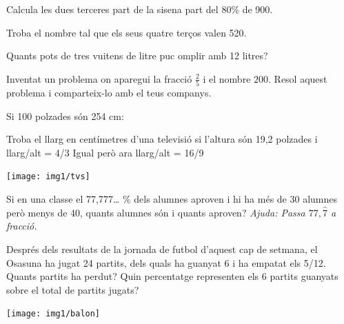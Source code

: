 \begin{mylist}
	\exer \spen  Calcula les dues terceres part de la sisena part del 80\% de 900.
 \vso

 
	\exer  \spen  Troba el nombre tal que els seus quatre terços valen 520.
 \vsoo
{}



 
	\exer  \spen  Quants pots de tres vuitens de litre puc omplir amb 12 litres?
 \vso
{}
 
	\exer  Inventat un problema on aparegui la fracció $\frac{2}{5}$ i el nombre $200$. Resol aquest problema i comparteix-lo amb el teus companys. 
	 
\redacta

\pagebreak
\mbox{}
\vspace{-1cm} 
 
 \exer \begin{minipage}[t]{0.56\textwidth}  Si 100 polzades són 254 cm:
 
\begin{tasks}
	\task Troba el llarg en centímetres d'una televisió si l'altura són 19,2 polzades i llarg/alt = 4/3
	\task Igual però ara llarg/alt = 16/9
\end{tasks}
\answers{[65.024 cm, 86.6986 cm]} 

\end{minipage}
\begin{minipage}{0.44\textwidth}
	\centering
	\vspace{0.5cm}
	\texttt{[image: img1/tvs]}
\end{minipage}

 
	\exer  Si en una classe el 77,777{\dots} \% dels alumnes aproven i hi ha més de 30 alumnes però menys de 40, quants alumnes són i quants aproven? \textit{Ajuda: Passa $77,\hat{7}$ a fracció.}
 


\vspace{-0.75cm}
	\exer  
	\begin{minipage}[t]{0.8\textwidth}
	Després dels resultats de la jornada de futbol d'aquest cap de setmana, el Osasuna ha jugat 24 partits, dels quals ha guanyat 6 i ha empatat els 5/12. Quants partits ha perdut? Quin percentatge representen els 6 partits guanyats sobre el total de partits jugats?
	\end{minipage}
	\begin{minipage}{0.2\textwidth}
		\centering
		\vspace{0.5cm}
		\texttt{[image: img1/balon]}
	\end{minipage}



\end{mylist}
